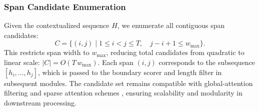 \subsubsection{Span Candidate Enumeration}

Given the contextualized sequence \(H\), we enumerate all contiguous span candidates:
\[
C = \{(i,j)\mid 1 \le i < j \le T,\quad j - i + 1 \le w_{\max}\}.
\]
This restricts span width to \(w_{\max}\), reducing total candidates from quadratic to linear scale: \(|C| = O(T\,w_{\max})\). Each span \((i,j)\) corresponds to the subsequence \([h_i,\dots,h_j]\), which is passed to the boundary scorer and length filter in subsequent modules. The candidate set remains compatible with global-attention filtering and sparse attention schemes \cite{joshi2020spanbert,tay2021charformer}, ensuring scalability and modularity in downstream processing.
